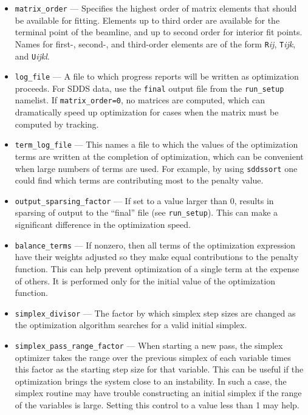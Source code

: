 \documentclass[11pt]{article}
\begin{document}
\begin{itemize}
\item \verb|matrix_order| --- Specifies the highest order of matrix elements that
should be available for fitting.  Elements up to third order are available for
the terminal point of the beamline, and up to second order for interior fit points.
Names for first-, second-, and third-order elements are of the form
{\tt R}{\em ij}, {\tt T}{\em ijk}, and {\tt U}{\em ijkl}.
\item \verb|log_file| --- A file to which progress reports will be written as optimization proceeds.
For SDDS data, use the \verb|final| output file from the \verb|run_setup| namelist.
If \verb|matrix_order=0|, no matrices are computed, which can dramatically speed up optimization for
cases when the matrix must be computed by tracking.

\item \verb|term_log_file| --- This names a file to which the
  values of the optimization terms are written at the completion of optimization, which can be convenient when large numbers
  of terms are used.  For example, by using \verb|sddssort| one could find which terms are contributing most to the
  penalty value.

\item \verb|output_sparsing_factor| --- If set to a value larger than 0, results in
sparsing of output to the ``final'' file (see \verb|run_setup|). This can make
a significant difference in the optimization speed.

\item \verb|balance_terms| --- If nonzero, then all terms of the optimization expression have
 their weights adjusted so they make equal contributions to the penalty function.  This can
 help prevent optimization of a single term at the expense of others.  It is performed only 
 for the initial value of the optimization function.

\item \verb|simplex_divisor| --- The factor by which simplex step sizes are changed as the 
 optimization algorithm searches for a valid initial simplex.

\item \verb|simplex_pass_range_factor| --- When starting a new pass, the simplex optimizer takes
 the range over the previous simplex of each variable times this factor
 as the starting step size for that variable.  This can be useful if the optimization brings
 the system close to an instability.  In such a case, the simplex routine may have trouble
 constructing an initial simplex if the range of the variables is large. Setting this control
 to a value less than 1 may help.
 

\end{itemize}
\end{document}

